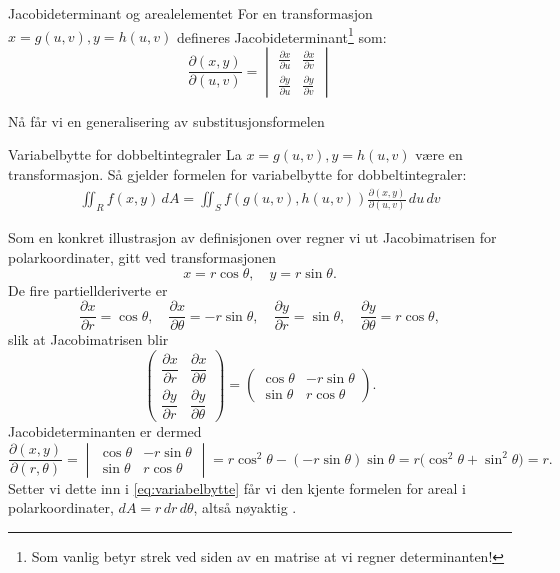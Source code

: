 \begin{defn}{Jacobideterminant og arealelementet}
For en transformasjon $x = g(u, v), y = h(u, v)$ defineres Jacobideterminant\footnote{Som vanlig betyr strek ved siden av en matrise at vi regner determinanten!} som:
\[
\frac{\partial(x, y)}{\partial(u, v)} = \begin{vmatrix} \frac{\partial x}{\partial u} & \frac{\partial x}{\partial v} \\ \frac{\partial y}{\partial u} & \frac{\partial y}{\partial v} \end{vmatrix}
\]
\end{defn}
Nå får vi en generalisering av substitusjonsformelen 
\begin{oppsum}{Variabelbytte for dobbeltintegraler}
La $x=g(u,v),y=h(u,v)$ være en transformasjon. Så gjelder formelen for variabelbytte for dobbeltintegraler:
\begin{align}\label{eq:variabelbytte}
\iint_R f(x, y)\, dA = \iint_S f(g(u, v), h(u, v))\frac{\partial(x, y)}{\partial(u, v)}\, du\, dv
\end{align}
\end{oppsum}

Som en konkret illustrasjon av definisjonen over regner vi ut Jacobimatrisen for polarkoordinater, gitt ved transformasjonen
\[
x = r\cos\theta, \quad y = r\sin\theta.
\]
De fire partiellderiverte er
\[
\frac{\partial x}{\partial r} = \cos\theta, \quad \frac{\partial x}{\partial \theta} = -r\sin\theta, \quad \frac{\partial y}{\partial r} = \sin\theta, \quad \frac{\partial y}{\partial \theta} = r\cos\theta,
\]
slik at Jacobimatrisen blir
\[
\begin{pmatrix} \dfrac{\partial x}{\partial r} & \dfrac{\partial x}{\partial \theta} \\[2mm] \dfrac{\partial y}{\partial r} & \dfrac{\partial y}{\partial \theta} \end{pmatrix} = \begin{pmatrix} \cos\theta & -r\sin\theta \\ \sin\theta & r\cos\theta \end{pmatrix}.
\]
Jacobideterminanten er dermed
\[
\frac{\partial(x, y)}{\partial(r, \theta)} = \begin{vmatrix} \cos\theta & -r\sin\theta \\ \sin\theta & r\cos\theta \end{vmatrix} = r\cos^2\theta - (-r\sin\theta)\sin\theta = r\bigl(\cos^2\theta+\sin^2\theta\bigr) = r.
\]
Setter vi dette inn i \eqref{eq:variabelbytte} får vi den kjente formelen for areal i polarkoordinater, $dA = r\, dr\, d\theta$, altså nøyaktig .

